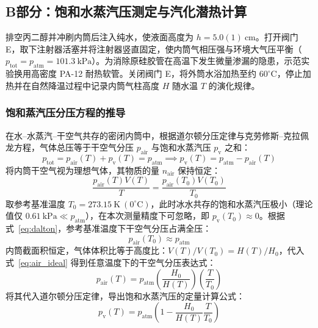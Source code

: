 \documentclass[10pt, a4paper]{ctexart}
\begin{document}
\subsection{B部分：饱和水蒸汽压测定与汽化潜热计算}
排空丙二醇并冲刷内筒后注入纯水，使液面高度为 $h = 5.0(1)\ \mathrm{cm}$。打开阀门 E，取下注射器活塞并将注射器竖直固定，使内筒气相压强与环境大气压平衡（$p_{\mathrm{tot}} = p_{\mathrm{atm}} = 101.3\ \mathrm{kPa}$）。为消除原硅胶管在高温下发生微量渗漏的隐患，示范实验换用高密度 PA-12 耐热软管。关闭阀门 E，将外筒水浴加热至约 $60^\circ\mathrm{C}$，停止加热并在自然降温过程中记录内筒气柱高度 $H$ 随水温 $T$ 的演化规律。

\subsubsection{饱和蒸汽压分压方程的推导}
在水--水蒸汽--干空气共存的密闭内筒中，根据道尔顿分压定律与克劳修斯--克拉佩龙方程\cite{ref6, ref7, ref9}，气体总压等于干空气分压 $p_{\mathrm{air}}$ 与饱和水蒸汽压 $p_{\mathrm{v}}$ 之和：
\begin{equation}
p_{\mathrm{tot}} = p_{\mathrm{air}}(T) + p_{\mathrm{v}}(T) = p_{\mathrm{atm}} \implies p_{\mathrm{v}}(T) = p_{\mathrm{atm}} - p_{\mathrm{air}}(T)
\label{eq:dalton}
\end{equation}
将内筒干空气视为理想气体，其物质的量 $n_{\mathrm{air}}$ 保持恒定：
\begin{equation}
\frac{p_{\mathrm{air}}(T) V(T)}{T} = \frac{p_{\mathrm{air}}(T_0) V(T_0)}{T_0}
\label{eq:air_ideal}
\end{equation}
取参考基准温度 $T_0 = 273.15\ \mathrm{K}\ (0^\circ\mathrm{C})$，此时冰水共存的饱和水蒸汽压极小（理论值仅 $0.61\ \mathrm{kPa} \ll p_{\mathrm{atm}}$），在本次测量精度下可忽略，即 $p_{\mathrm{v}}(T_0) \approx 0$。根据式~\eqref{eq:dalton}，参考基准温度下干空气分压占满全压：
\begin{equation}
p_{\mathrm{air}}(T_0) \approx p_{\mathrm{atm}}
\end{equation}
内筒截面积恒定，气体体积比等于高度比：$V(T)/V(T_0) = H(T)/H_0$，代入式~\eqref{eq:air_ideal} 得到任意温度下的干空气分压表达式：
\begin{equation}
p_{\mathrm{air}}(T) = p_{\mathrm{atm}}\left(\frac{H_0}{H(T)}\right)\left(\frac{T}{T_0}\right)
\end{equation}
将其代入道尔顿分压定律，导出饱和水蒸汽压的定量计算公式：
\begin{equation}
p_{\mathrm{v}}(T) = p_{\mathrm{atm}}\left(1 - \frac{H_0}{H(T)}\frac{T}{T_0}\right)
\label{eq:vapor_calc}
\end{equation}
\end{document}
